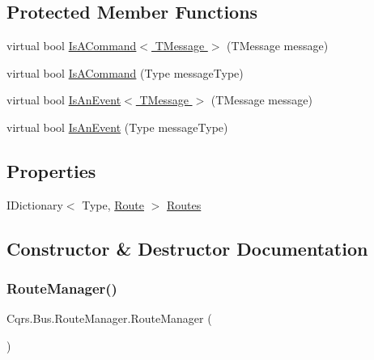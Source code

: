 \subsection*{Protected Member Functions}
\begin{DoxyCompactItemize}
\item 
virtual bool \hyperlink{classCqrs_1_1Bus_1_1RouteManager_a1ee8d583bb5d75a54cdac03c8e84b8d9}{Is\+A\+Command$<$ T\+Message $>$} (T\+Message message)
\item 
virtual bool \hyperlink{classCqrs_1_1Bus_1_1RouteManager_a7b7bfc4db30cc5956c4acd6a342e9159}{Is\+A\+Command} (Type message\+Type)
\item 
virtual bool \hyperlink{classCqrs_1_1Bus_1_1RouteManager_a7e5099741cd4b3e538599c771581a4b6}{Is\+An\+Event$<$ T\+Message $>$} (T\+Message message)
\item 
virtual bool \hyperlink{classCqrs_1_1Bus_1_1RouteManager_a7b9b2ad8b9f5d7761b0f45c033b96101}{Is\+An\+Event} (Type message\+Type)
\end{DoxyCompactItemize}
\subsection*{Properties}
\begin{DoxyCompactItemize}
\item 
I\+Dictionary$<$ Type, \hyperlink{classCqrs_1_1Bus_1_1Route}{Route} $>$ \hyperlink{classCqrs_1_1Bus_1_1RouteManager_ad6a3c8e41e10f62d075e52d08d817cee}{Routes}
\end{DoxyCompactItemize}


\subsection{Constructor \& Destructor Documentation}
\mbox{\label{classCqrs_1_1Bus_1_1RouteManager_abcc8a62319ac7a6edd38ed2d26ef5234}} 
\subsubsection{\texorpdfstring{Route\+Manager()}{RouteManager()}}
{\footnotesize\ttfamily Cqrs.\+Bus.\+Route\+Manager.\+Route\+Manager (\begin{DoxyParamCaption}{ }\end{DoxyParamCaption})}




